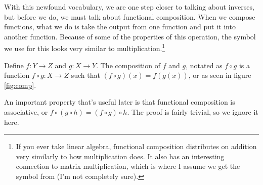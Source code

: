 With this newfound vocabulary, we are one step closer to talking about inverses, but before we do, we must talk about functional composition.
When we compose functions, what we do is take the output from one function and put it into another function.
Because of some of the properties of this operation, the symbol we use for this looks very similar to multiplication.\footnote{If you ever take linear algebra, functional composition distributes on addition very similarly to how multiplication does. It also has an interesting connection to matrix multiplication, which is where I assume we get the symbol from (I'm not completely sure).}

\begin{figure}[h]
\centering
{}
	\caption{}
	\label{fig:comp}
\end{figure}

\begin{define}
	Define $f:Y\to Z$ and $g:X\to Y$. The composition of $f$ and $g$, notated as $f\circ g$ is a function $f\circ g:X\to Z$ such that $(f\circ g)(x)=f(g(x))$, or as seen in figure \eqref{fig:comp}.
\end{define}

An important property that's useful later is that functional composition is associative, or $f\circ (g\circ h)=(f\circ g) \circ h$. The proof is fairly trivial, so we ignore it here.

